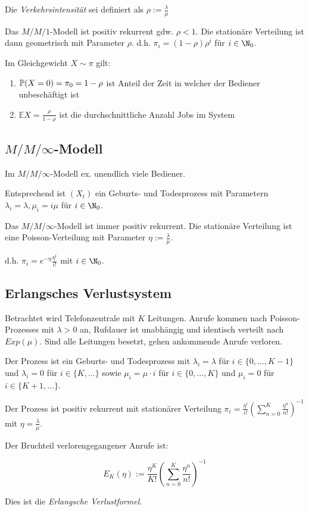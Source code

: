 Die \emph{Verkehrsintensität} sei definiert als $\rho := \frac{\lambda}{\mu}$

\spacing

Das $M/M/1$-Modell ist positiv rekurrent gdw. $\rho < 1$. Die stationäre Verteilung ist dann geometrisch mit Parameter $\rho$. d.h. $\pi_i = (1-\rho)\rho^i$ für $i \in \N_0$.

\vspace*{1mm}

Im Gleichgewicht $X \sim \pi$ gilt:

\begin{enumerate}[label=(\alph*)]
	\item $\P(X=0) = \pi_0 = 1 - \rho$ ist Anteil der Zeit in welcher der Bediener unbeschäftigt ist
	\item $\mathbb{E}X = \frac{\rho}{1-\rho}$ ist die durchschnittliche Anzahl Jobs im System
\end{enumerate}

\subsection*{$M/M/\infty$-Modell}

Im $M/M/\infty$-Modell ex. unendlich viele Bediener.

Entsprechend ist $(X_t)$ ein Geburts- und Todesprozess mit Parametern $\lambda_i = \lambda, \mu_i = i\mu$ für $i \in \N_0$.

\vspace*{1mm}

Das $M/M/\infty$-Modell ist immer positiv rekurrent. Die stationäre Verteilung ist eine Poisson-Verteilung mit Parameter $\eta := \frac{\lambda}{\mu}$.

d.h. $\pi_i = e^{-\eta}\frac{\eta^i}{i!}$ mit $i \in \N_0$.

\subsection*{Erlangsches Verlustsystem}

Betrachtet wird Telefonzentrale mit $K$ Leitungen. Anrufe kommen nach Poisson-Prozesses mit $\lambda > 0$ an, Rufdauer ist unabhängig und identisch verteilt nach $Exp(\mu)$. Sind alle Leitungen besetzt, gehen ankommende Anrufe verloren.

Der Prozess ist ein Geburts- und Todesprozess mit $\lambda_i = \lambda$ für $i \in \{0,\dots,K-1\}$ und $\lambda_i = 0$ für $i \in \{K,\dots\}$ sowie $\mu_i = \mu \cdot i$ für $i \in \{0,\dots,K\}$ und $\mu_i = 0$ für $i \in \{K+1,\dots\}$.

Der Prozess ist positiv rekurrent mit stationärer Verteilung $\pi_i = \frac{\eta^i}{i!}\left(\sum_{n=0}^K \frac{\eta^n}{n!}\right)^{-1}$ mit $\eta = \frac{\lambda}{\mu}$.

Der Bruchteil verlorengegangener Anrufe ist:

\vspace*{-2mm}
\[ E_K(\eta) := \frac{\eta^K}{K!} \left( \sum_{n=0}^K \frac{\eta^n}{n!} \right)^{-1} \]

Dies ist die \emph{Erlangsche Verlustformel}.
